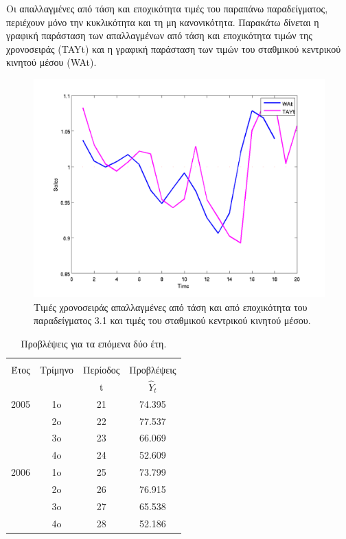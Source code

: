 Οι απαλλαγμένες από τάση και εποχικότητα τιμές του παραπάνω παραδείγματος, περιέχουν μόνο την
κυκλικότητα και τη μη κανονικότητα. Παρακάτω δίνεται η γραφική παράσταση των απαλλαγμένων από τάση και εποχικότητα τιμών της χρονοσειράς (TAYt) και η γραφική παράσταση των τιμών του σταθμικού κεντρικού κινητού μέσου (WAt).
\begin{figure} [ht]
  \centering
  \includegraphics[totalheight=3.2in,angle=0]{graff6.png}
  \caption{Τιμές χρονοσειράς απαλλαγμένες από τάση και από εποχικότητα του παραδείγματος 3.1 και τιμές του σταθμικού κεντρικού κινητού μέσου.}
\end{figure}

\begin{table} [h]
  \caption{Προβλέψεις για τα επόμενα δύο έτη.} 
  \label{tab_5}
  \begin{center}
    \begin{tabular}{|c |c | c| c|}
      \hline 
       &  &  &  \\
       Έτος &Τρίμηνο   &Περίοδος   &Προβλέψεις  \\
       &   & t  & $\widehat{Y}_t$  \\    
       \hline \hline
       2005 & 1o & 21 & 74.395 \\
            & 2o & 22 & 77.537 \\
            & 3o & 23 & 66.069 \\
            & 4o & 24 & 52.609 \\
       2006 & 1o & 25 & 73.799 \\
            & 2o & 26 & 76.915 \\
            & 3o & 27 & 65.538 \\
            & 4o & 28 & 52.186 \\     
      \hline
    \end{tabular}
  \end{center}
\end{table}


